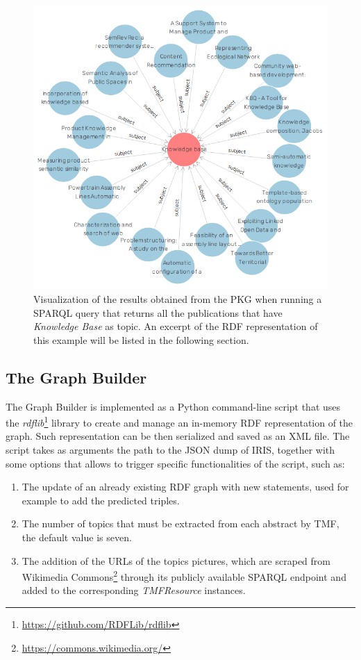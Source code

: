 \documentclass[%
    corpo=13.5pt,
    twoside,
    oldstyle,
    tipotesi=magistrale,
    greek,
    evenboxes
]{toptesi}
\begin{document}
\begin{figure}[h]
    \setlength{\belowcaptionskip}{+15pt}
    \centering
    \includegraphics[scale=0.35]{img/subject_knowledge_base.png}
    \caption{
        Visualization of the results obtained from
        the PKG when running a SPARQL query that returns
        all the publications that have \emph{Knowledge Base}
        as topic.
        An excerpt of the RDF representation of this example will be listed in
        the following section.
    }
    \label{fig:subject-knowledge-base}
\end{figure}



\subsection{The Graph Builder}

The Graph Builder is implemented as a Python command-line script that uses
the \emph{rdflib}\footnote{\url{https://github.com/RDFLib/rdflib}} library
to create and manage an in-memory RDF representation of the graph.
Such representation can be then serialized and saved as an XML file.
The script takes as arguments the path to the JSON dump of IRIS, together
with some options that allows to trigger specific functionalities of the
script, such as:

\begin{enumerate}
    \item The update of an already existing RDF graph with new statements,
        used for example to add the predicted triples.
    \item The number of topics that must be extracted from each abstract by
        TMF, the default value is seven.
    \item The addition of the URLs of
        the topics pictures, which are scraped from Wikimedia
        Commons\footnote{\url{https://commons.wikimedia.org/}} through
        its publicly available SPARQL endpoint and added
        to the corresponding \emph{TMFResource} instances.
\end{enumerate}
\end{document}
